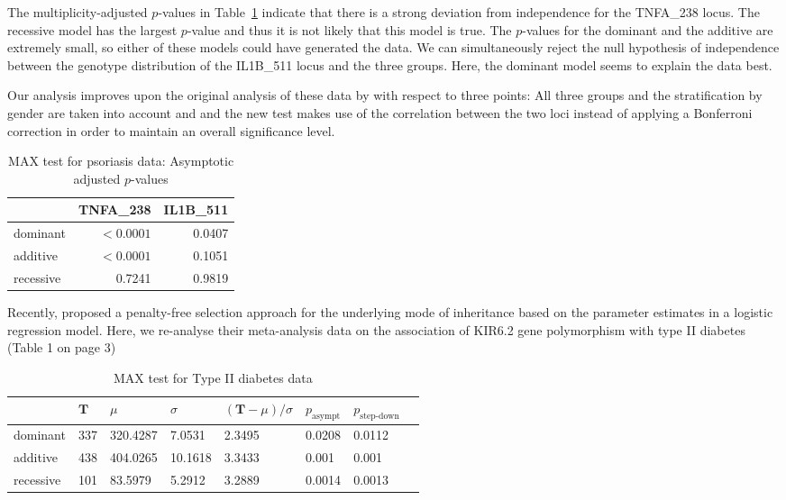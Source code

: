 \documentclass[bimj,fleqn]{w-art}
\newcommand{\T}{\mathbf{T}}
\begin{document}
The multiplicity-adjusted $p$-values in Table~\ref{pstab} indicate that
there is a strong deviation from independence for the TNFA\_238 locus.
The recessive model has the largest $p$-value and thus it is not likely
that this model is true. The $p$-values for the dominant and the 
additive are extremely small, so either of these models could have generated 
the data. We can simultaneously reject the null hypothesis of independence
between the genotype distribution of the IL1B\_511 locus and the three groups.
Here, the dominant model seems to explain the data best. 

Our analysis improves upon the original analysis of these data by \citet{Reich:2002}
with respect to three points: All three groups and the stratification
by gender are taken into account and and the new test makes use of the
correlation between the two loci instead of applying a Bonferroni correction
in order to maintain an overall significance level.


\begin{table}
\begin{center}
\caption{MAX test for psoriasis data: Asymptotic adjusted $p$-values \label{pstab}}
\vspace*{0.5cm}
\begin{tabular}{lrr}
 & TNFA\_238 & IL1B\_511 \\ \hline
dominant  &  $< 0.0001$&0.0407 \\ 
additive  &  $< 0.0001$&0.1051 \\ 
recessive  &  0.7241&0.9819 \\ \hline
\end{tabular}
\end{center}
\end{table}

Recently, \citet{Bagos2007} proposed a penalty-free selection approach for the underlying mode of inheritance
based on the parameter estimates in a logistic regression model. Here, we re-analyse their meta-analysis 
data on the association of KIR6.2 gene polymorphism with type II diabetes (Table 1 on page 3)



\begin{table}
\begin{center}
\caption{MAX test for Type II diabetes data \label{diares}}
\vspace*{0.5cm}
\begin{tabular}{l l l l l l l l}
 & $\T$ & $\mu$ & $ \sigma$ & $(\T - \mu) / \sigma$ & $p_\text{asympt}$ & $p_\text{step-down}$ \\ \hline
dominant  &  337 & 320.4287 & 7.0531 & 2.3495 & 0.0208 & 0.0112 \\ 
additive  &  438 & 404.0265 & 10.1618 & 3.3433 & 0.001 & 0.001 \\ 
recessive  &  101 & 83.5979 & 5.2912 & 3.2889 & 0.0014 & 0.0013 \\ \hline
\end{tabular}
\end{center}
\end{table}
\end{document}
